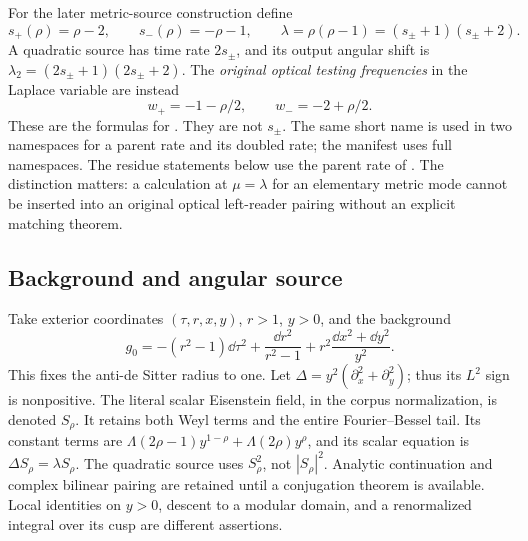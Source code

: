 For the later metric-source construction define
\[
 s_+(\rho)=\rho-2,\qquad s_-(\rho)=-\rho-1,\qquad
 \lambda=\rho(\rho-1)=(s_\pm+1)(s_\pm+2).
\]
A quadratic source has time rate \(2s_\pm\), and its output angular shift is
\(\lambda_2=(2s_\pm+1)(2s_\pm+2)\).
The \emph{original optical testing frequencies} in the Laplace variable are instead
\begin{equation}\label{eq:testing}
 w_+=-1-\rho/2,\qquad w_-=-2+\rho/2.
\end{equation}
These are the formulas for . They are not \(s_\pm\). The same short name  is used in two namespaces for a parent rate and its doubled rate; the manifest uses full namespaces. The residue statements below use the parent rate of .
The distinction matters: a calculation at \(\mu=\lambda\) for an elementary metric mode cannot be inserted into an original optical left-reader pairing without an explicit matching theorem.

\subsection{Background and angular source}

Take exterior coordinates \((\tau,r,x,y)\), \(r>1\), \(y>0\), and the background
\[
 g_0=-(r^2-1)\dd\tau^2+\frac{\dd r^2}{r^2-1}
       +r^2\frac{\dd x^2+\dd y^2}{y^2}.
\]
This fixes the anti-de Sitter radius to one. Let \(\Delta=y^2(\partial_x^2+\partial_y^2)\); thus its \(L^2\) sign is nonpositive. The literal scalar Eisenstein field, in the corpus normalization, is denoted \(S_\rho\). It retains both Weyl terms and the entire Fourier--Bessel tail. Its constant terms are
\(\Lambda(2\rho-1)y^{1-\rho}+\Lambda(2\rho)y^\rho\), and its scalar equation is \(\Delta S_\rho=\lambda S_\rho\). The quadratic source uses \(S_\rho^2\), not \(|S_\rho|^2\). Analytic continuation and complex bilinear pairing are retained until a conjugation theorem is available. Local identities on \(y>0\), descent to a modular domain, and a renormalized integral over its cusp are different assertions.

